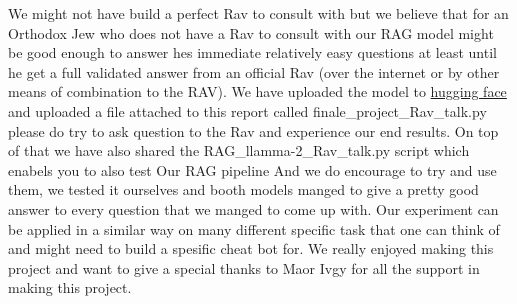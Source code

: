 \documentclass[11pt]{article}
\begin{document}
We might not have build a perfect Rav to consult with but we believe that for an Orthodox Jew who does not have a Rav to consult with our RAG model might be good enough to answer hes immediate relatively easy questions at least until he get a full validated answer from an official Rav (over the internet or by other means of combination to the RAV).
We have uploaded the model to \href{https://huggingface.co/tomer-shimshi/llama2-Rav?text=My+name+is+Thomas+and+my+main}{hugging face} and uploaded a file attached to this report called finale\_project\_Rav\_talk.py please do try to ask question to the Rav and experience our end results.
On top of that we have also shared the RAG\_llamma-2\_Rav\_talk.py script which enabels you to also test Our RAG pipeline And we do encourage to try and use them, we tested it ourselves and booth models manged to give a pretty good answer to every question that we manged to come up with. 
Our experiment can be applied in a similar way on many different specific task that one can think of and might need to build a spesific cheat bot for.
We really enjoyed making this project and want to give a special thanks to Maor Ivgy for all the support in making this project.
\end{document}
